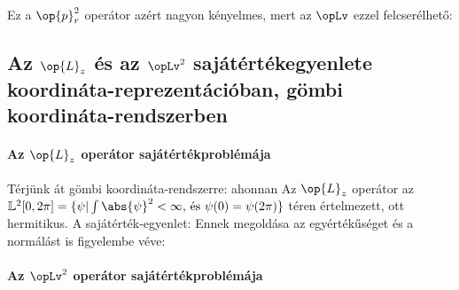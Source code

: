    Ez a $\op{p}_r^2$ operátor azért nagyon kényelmes, mert az $\opLv$ ezzel felcserélhető:
   
  \subsection{Az $\op{L}_z$ és az $\opLv^2$ sajátértékegyenlete koordináta-reprezentációban, gömbi koordináta-rendszerben}
   
   \paragraph{Az $\op{L}_z$ operátor sajátértékproblémája}
    
    Térjünk át gömbi koordináta-rendszerre:
    ahonnan 
    Az $\op{L}_z$ operátor az $\mathbb{L}^2[0,2\pi]=\{\psi | \int\abs{\psi}^2<\infty\text{, és }\psi(0)=\psi(2\pi)\}$ téren értelmezett, ott hermitikus.
   A sajátérték-egyenlet:
    Ennek megoldása az egyértékűséget és a normálást is figyelembe véve:
    
   \paragraph{Az $\opLv^2$ operátor sajátértékproblémája}\label{ss:06-L2spme}
    
